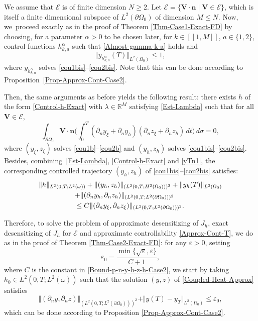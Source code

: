 \documentclass[JEP,XML,SOM,Unicode,NoFloatCountersInSection]{cedram}
\newcommand{\llbracket}{[\![}
\newcommand{\rrbracket}{]\!]}
\newcommand{\bn}{\boldsymbol{n}}
\newcommand{\bV}{\boldsymbol{V}}
\newcommand\R{{\mathbb R}}
\newcommand{\norm}[1]{\Vert#1\Vert}
\theoremstyle{definition}
\begin{document}
We assume that $\mathcal{E}$ is of finite dimension $N\geqslant 2$.
Let $\mathscr{E} = \{ \bV\cdot \bn\mid \bV \in \mathcal{E}\}$, which is itself a finite dimensional subspace of $L^2(\partial\Omega_0)$ of dimension $M\leqslant N$. Now, we~proceed exactly as in the proof of Theorem \ref{Thm-Case1-Exact-FD} by choosing, {for a parameter $\alpha>0$ to be chosen later, }for $k \in \llbracket 1,M \rrbracket $, $a \in \{1,2\}$, control functions $h_{k,a}^\alpha$ such that \eqref{Almost-gamma-k-a} holds and
\begin{equation}\label{yTn1}
\norm{y_{h_{k,a}^\alpha}(T)}_{L^2(\Omega_0)} \leq 1,
\end{equation}
{where $y_{h_{k,a}^\alpha}$ solves \eqref{cou1bis}--\eqref{cou2bis}. Note that this can be done according to Proposition~\ref{Prop-Approx-Cont-Case2}.}

Then, the same arguments as before yields the following result: there exists {$h$ of the form \eqref{Control-h-Exact} with $\lambda \in \R^M$ satisfying \eqref{Est-Lambda}} such that for all $\bV \in \mathcal{E}$,\vspace*{-3pt}
\[
\int_{\partial \Omega_0} \bV \cdot \bn \biggl(\int_0^T (\partial_n y_\xi + \partial_n y_h) (\partial_n z_\xi + \partial_n z_h) \, dt \biggr)\, d\sigma = 0,
\]
where $(y_\xi, z_\xi)$ solves \eqref{cou1b}--\eqref{cou2b} and $(y_h,z_h)$ solves \eqref{cou1bis}--\eqref{cou2bis}. Besides, combining~\eqref{Est-Lambda}, \eqref{Control-h-Exact} and \eqref{yTn1}, the corresponding controlled trajectory $(y_h,z_h)$ of \eqref{cou1bis}--\eqref{cou2bis} satisfies:\vspace*{-3pt}
\begin{multline}
\label{Bound-p-n-y-h-z-h-Case2}
\norm{h}_{L^2(0,T; L^2(\omega))}
+
\norm{(y_h,z_h)}_{(L^2(0,T; H^2(\Omega_0)))^2}
+
\norm{y_h(T)}_{L^2(\Omega_0)}\\
\hspace*{-6mm}+
\norm{(\partial_n y_h, \partial_n z_h)}_{(L^2(0,T; L^2(\partial \Omega_0)))^2}
\\
\leq
C \norm{(\partial_n y_\xi, \partial_n z_\xi)}_{(L^2(0,T; L^2(\partial \Omega_0)))^2}.
\end{multline}

Therefore, to solve the problem of approximate desensitizing of $J_h$, exact desensitizing of $J_h$ for $\mathcal{E}$ and approximate controllability \eqref{Approx-Cont-T}, we do as in the proof of Theorem \ref{Thm-Case2-Exact-FD}: for any $\varepsilon>0$, setting\vspace*{-3pt}
\[
\varepsilon_0 = {\frac{\min\{\sqrt{\varepsilon}, \varepsilon\}}{C + 1},}
\]
where $C$ is the constant in \eqref{Bound-p-n-y-h-z-h-Case2},
we start by taking $h_0 \in L^2(0,T; L^2(\omega))$ such that the solution $(y,z)$ of \eqref{Coupled-Heat-Approx} satisfies
\[
\norm{(\partial_n y, \partial_n z)}_{(L^2(0,T; L^2(\partial \Omega_0)))^2}
+ \norm{y(T) - y_T}_{L^2(\Omega_0)}
\leq \varepsilon_0,
\]
which can be done according to Proposition \ref{Prop-Approx-Cont-Case2}.
\end{document}
